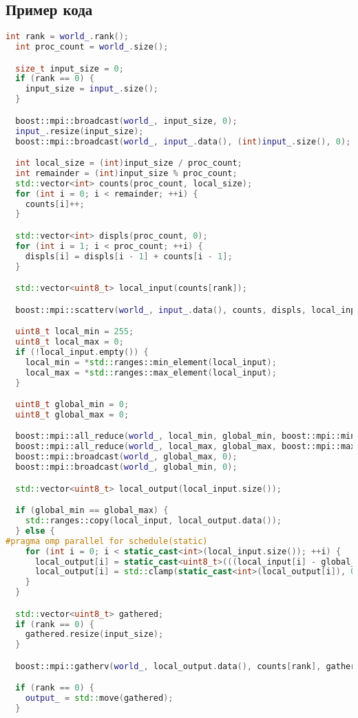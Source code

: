 \documentclass[14pt,a4paper]{extarticle}
\begin{document}
\subsection*{Пример кода}
\begin{lstlisting}[language=C++]
int rank = world_.rank();
  int proc_count = world_.size();

  size_t input_size = 0;
  if (rank == 0) {
    input_size = input_.size();
  }

  boost::mpi::broadcast(world_, input_size, 0);
  input_.resize(input_size);
  boost::mpi::broadcast(world_, input_.data(), (int)input_.size(), 0);

  int local_size = (int)input_size / proc_count;
  int remainder = (int)input_size % proc_count;
  std::vector<int> counts(proc_count, local_size);
  for (int i = 0; i < remainder; ++i) {
    counts[i]++;
  }

  std::vector<int> displs(proc_count, 0);
  for (int i = 1; i < proc_count; ++i) {
    displs[i] = displs[i - 1] + counts[i - 1];
  }

  std::vector<uint8_t> local_input(counts[rank]);

  boost::mpi::scatterv(world_, input_.data(), counts, displs, local_input.data(), counts[rank], 0);

  uint8_t local_min = 255;
  uint8_t local_max = 0;
  if (!local_input.empty()) {
    local_min = *std::ranges::min_element(local_input);
    local_max = *std::ranges::max_element(local_input);
  }

  uint8_t global_min = 0;
  uint8_t global_max = 0;

  boost::mpi::all_reduce(world_, local_min, global_min, boost::mpi::minimum<uint8_t>());
  boost::mpi::all_reduce(world_, local_max, global_max, boost::mpi::maximum<uint8_t>());
  boost::mpi::broadcast(world_, global_max, 0);
  boost::mpi::broadcast(world_, global_min, 0);

  std::vector<uint8_t> local_output(local_input.size());

  if (global_min == global_max) {
    std::ranges::copy(local_input, local_output.data());
  } else {
#pragma omp parallel for schedule(static)
    for (int i = 0; i < static_cast<int>(local_input.size()); ++i) {
      local_output[i] = static_cast<uint8_t>(((local_input[i] - global_min) / (double)(global_max - global_min)) * 255);
      local_output[i] = std::clamp(static_cast<int>(local_output[i]), 0, 255);
    }
  }

  std::vector<uint8_t> gathered;
  if (rank == 0) {
    gathered.resize(input_size);
  }

  boost::mpi::gatherv(world_, local_output.data(), counts[rank], gathered.data(), counts, displs, 0);

  if (rank == 0) {
    output_ = std::move(gathered);
  }
\end{lstlisting}
\end{document}

